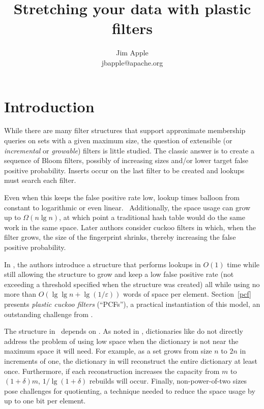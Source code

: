 \documentclass[letterpaper, 11pt]{article}
\begin{document}
\title{Stretching your data with plastic filters}
\author{Jim Apple \\
  jbapple@apache.org}

\maketitle


\section{Introduction}

While there are many filter structures that support approximate membership queries on sets with a given maximum size, the question of extensible (or {\em incremental} or {\em growable}) filters is little studied.
The classic answer is to create a sequence of Bloom filters, possibly of increasing sizes and/or lower target false positive probability.
Inserts occur on the last filter to be created and lookups must search each filter.

Even when this keeps the false positive rate low, lookup times balloon from constant to logarithmic or even linear.~\cite{psw,logarithm,consistent-cuckoo} %
Additionally, the space usage can grow up to $\Omega(n \lg n)$, at which point a traditional hash table would do the same work in the same space.
Later authors consider cuckoo filters in which, when the filter grows, the size of the fingerprint shrinks, thereby increasing the false positive probability.~\cite{logarithm,morton-journal,vacuum,rsqf}

In \cite{psw}, the authors introduce a structure that performs lookups in $O(1)$ time while still allowing the structure to grow and keep a low false positive rate (not exceeding a threshold specified when the structure was created) all while using no more than $O(\lg \lg n + \lg (1/\varepsilon))$ words of space per element.
Section~\ref{pcf} presents {\em plastic cuckoo filters} (``PCFs''), a practical instantiation of this model, an outstanding challenge from \cite{psw}.

The structure in~\cite{psw} depends on \cite{succinct}.
As noted in \cite{dysect}, dictionaries like \cite{succinct} do not directly address the problem of using low space when the dictionary is not near the maximum space it will need.
For example, as a set grows from size $n$ to $2n$ in increments of one, the dictionary in \cite{succinct} will reconstruct the entire dictionary at least once.
Furthermore, if each reconstruction increases the capacity from $m$ to $(1 + \delta)m$, $1/\lg(1+\delta)$ rebuilds will occur.
Finally, non-power-of-two sizes pose challenges for quotienting, a technique needed to reduce the space usage by up to one bit per element.~\cite{change-your-base, cleary-quotient}
\end{document}
